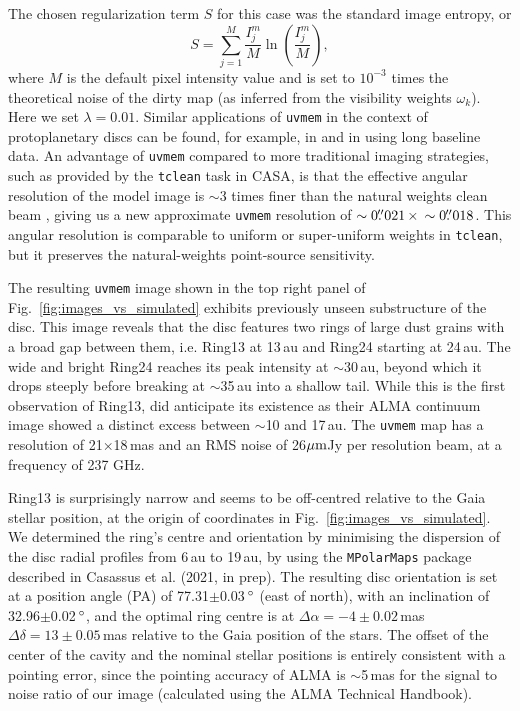 \documentclass[fleqn,usenatbib,useAMS]{mnras}
\begin{document}
The chosen regularization term $S$ for this case was the standard image entropy, or
\begin{equation}
S = \sum_{j=1}^M \frac{I_j^m}{M} \ln\left(\frac{I_j^m}{M}\right),
\end{equation}
where $M$ is the default pixel intensity value and is set to $10^{-3}$ times the theoretical noise of the dirty map (as inferred from the visibility weights $\omega_k$). Here we set $\lambda = 0.01$. Similar applications of {\tt uvmem} in the context of protoplanetary discs can be found, for example, in \citet{Casassus2013Natur, 2018MNRAS.477.5104C, Casassus2019MNRAS.483.3278C, Perez2019AJ....158...15P} and in \citet{2020ApJ...889L..24P} using long baseline data. An advantage of {\tt uvmem} compared to more traditional imaging strategies, such as provided by the {\tt tclean} task in CASA, is that the effective angular resolution of the model image is $\sim$3 times finer than the natural weights clean beam \citep[][]{2018A&C....22...16C}, giving us a new approximate {\tt uvmem} resolution of $\sim0\hbox{$.\!\!^{\prime\prime}$}021 \,\times \,\sim0\hbox{$.\!\!^{\prime\prime}$}018$. This angular resolution is comparable to uniform or super-uniform weights in {\tt tclean}, but it preserves the natural-weights point-source sensitivity.

The resulting {\tt uvmem} image shown in the top right panel of Fig.~\ref{fig:images_vs_simulated} exhibits previously unseen substructure of the disc. This image reveals that the disc features two rings of large dust grains with a broad gap between them, i.e. Ring13 at 13\,au and Ring24 starting at 24\,au. The wide and bright Ring24 reaches its peak intensity at $\sim$30\,au, beyond which it drops steeply before breaking at $\sim$35\,au into a shallow tail. While this is the first observation of Ring13, \citet{Ru_z_Rodr_guez_2019} did anticipate its existence as their ALMA continuum image showed a distinct excess between $\sim$10 and 17\,au. The {\tt uvmem} map has a resolution of 21$\times$18\,mas and an RMS noise of 26$\hbox{$\mu$m}$Jy per resolution beam, at a frequency of 237 GHz.

Ring13 is surprisingly narrow and seems to be off-centred relative to the Gaia stellar position, at the origin of coordinates in Fig.~\ref{fig:images_vs_simulated}. We determined the ring's centre and orientation by minimising the dispersion of the disc radial profiles from 6\,au to 19\,au, by using the {\tt MPolarMaps} package described in Casassus et al. (2021, in prep). The resulting disc orientation is set at a position angle (PA) of 77.31$\pm$0.03\,$\hbox{$^\circ$}$ (east of north), with an inclination of 32.96$\pm$0.02\,$\hbox{$^\circ$}$, and the optimal ring centre is at $\Delta \alpha = -4\pm0.02$\,mas $\Delta \delta = 13\pm0.05$\,mas relative to the Gaia position of the stars. The offset of the center of the cavity and the nominal stellar positions is entirely consistent with a pointing error, since the pointing accuracy of ALMA is $\sim$5\,mas for the signal to noise ratio of our image (calculated using the ALMA Technical Handbook).
\end{document}
